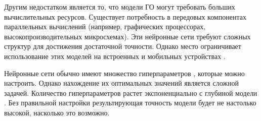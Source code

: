 Другим недостатком является то, что модели ГО могут требовать больших вычислительных ресурсов. Существует потребность в передовых компонентах параллельных вычислений (например, графических процессорах, высокопроизводительных микросхемах). Эти нейронные сети требуют сложных структур для достижения достаточной точности. Однако место ограничивает использование этих моделей на встроенных и мобильных устройствах \cite{deeplearninmob}.

Нейронные сети обычно имеют множество гиперпараметров \cite{giperparams}, которые можно настроить. Однако нахождение их оптимальных значений является сложной задачей. Количество гиперпараметров растет экспоненциально с глубиной модели \cite{deeplearninmob}. Без правильной настройки результирующая точность модели будет не настолько высокой, насколько это возможно.